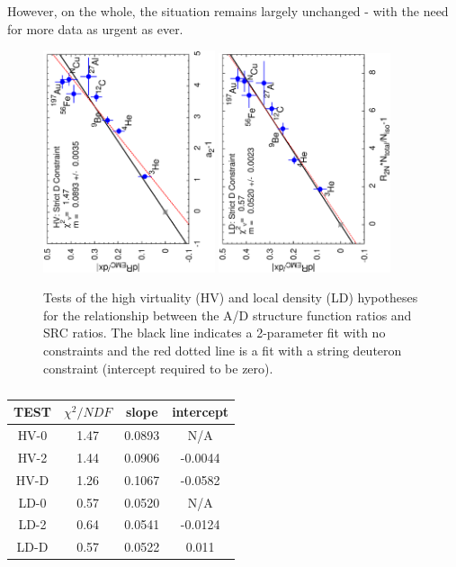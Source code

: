 However, on the whole, the situation remains largely unchanged - with the need
for more data as urgent as ever.

\begin{figure}[h!]
\includegraphics[angle=270,width=0.45\textwidth]{plots/plotfit_all_norescaling_no_cm_force0_rean_final_lp.eps}
\includegraphics[angle=270,width=0.45\textwidth]{plots/plotfit_all_nzaam1_xaxis_force0_xyerr_rean_final_lp.eps}
\caption{Tests of the high virtuality (HV) and local density (LD) hypotheses
for the relationship between the A/D structure function ratios and SRC ratios.
The black line indicates a 2-parameter fit with no constraints and the red
dotted line is a fit with a string deuteron constraint (intercept required to
be zero).}
\label{fig:src_emc_fit}
\end{figure}


\begin{table}
\begin{center}
\caption{}
\label{tab:fits_summary}
\begin{tabular}{| c | c | c | c |}
\hline
TEST & $\chi ^2/NDF$ & slope & intercept\\
\hline
HV-0 & 1.47 & 0.0893 & N/A\\
HV-2 & 1.44 & 0.0906 & -0.0044\\
HV-D & 1.26 & 0.1067 & -0.0582\\
LD-0 & 0.57 & 0.0520 & N/A\\
LD-2 & 0.64 & 0.0541 & -0.0124\\
LD-D & 0.57 & 0.0522 & 0.011\\
\hline
\end{tabular}
\end{center}
\end{table}

